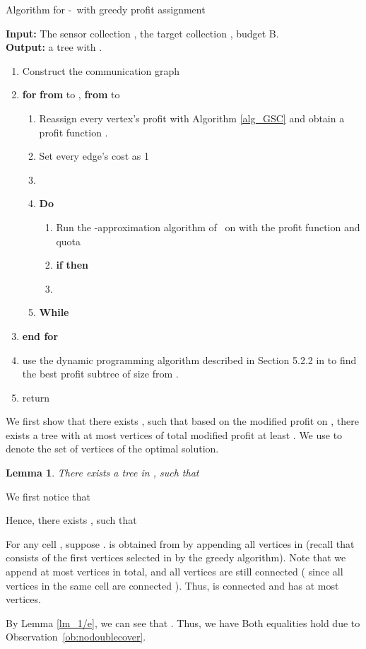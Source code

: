 \documentclass[11pt]{article}
\newcommand{\rednote}[1]{#1}
\newcommand{\bcsc}{-}
\newcommand{\qst}{}
\newenvironment{proof}{\noindent {\em Proof: }\ignorespaces}{}
\newcommand{\qed}{\hspace*{\fill}\medskip}
\newtheorem{lemma}{Lemma}
\begin{document}
\begin{algorithm}
	\label{alg_gppafb}
	\caption{Algorithm for \bcsc\ with greedy profit assignment}
	\textbf{Input:} The sensor collection , the target collection , budget B. \\
	\textbf{Output:} a tree  with .
	\begin{enumerate}
		\item Construct the communication graph 	
		\item \textbf{for}  \textbf{from}  to ,  \textbf{from}  to 
		\begin{enumerate}
			\item Reassign every vertex's profit with Algorithm \ref{alg_GSC} \rednote{and obtain a profit function }.
			\item Set every edge's cost as 1
			\item 
			\item \textbf{Do}
			\begin{enumerate}
				\item  Run the -approximation algorithm of \qst\ on  \rednote{with the profit function } and quota 
				\item \textbf{if}  \textbf{then} 
				\item 
			\end{enumerate}
			\item \textbf{While}		
		\end{enumerate}			
		\item \textbf{end for}
		\item  use the dynamic programming algorithm described in Section 5.2.2 in \cite{khuller2014analyzing} to find the best profit subtree of size  from .
		\item return 	
	\end{enumerate}
\end{algorithm}

We first show that there exists , such that based on the modified profit  on ,
there exists a tree with at most  vertices of total modified profit at least
.
We use  to denote the set of vertices of the optimal solution.

\begin{lemma}
	There exists a tree  in ,
	 such that 
	\label{lm_1/k^2}
\end{lemma}
\begin{proof}
	We first notice that
	
	Hence, there exists , such that
	
	For any cell , suppose .
	 is obtained from
	 by appending all vertices in  (recall that  consists of
	the first  vertices selected in  by the greedy algorithm).
	Note that we append at most  vertices in total, and all vertices are still connected
	(
	since all vertices in the same cell are connected
	).
	Thus,  is connected and has at most  vertices.
	
	By Lemma \ref{lm_1/e}, we can see that . Thus, we have 
	Both equalities hold due to Observation~\ref{ob:nodoublecover}.
	\qed
\end{proof}
\end{document}
